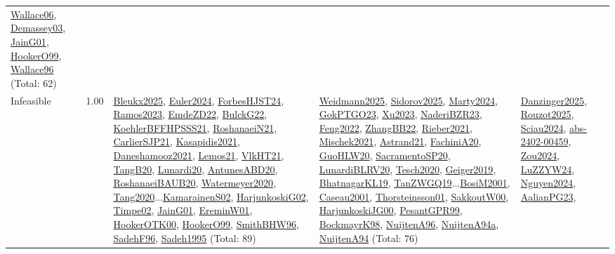 {\begin{longtable}{p{3cm}r>{\raggedright\arraybackslash}p{6cm}>{\raggedright\arraybackslash}p{6cm}>{\raggedright\arraybackslash}p{8cm}}
\hyperref[detail:Wallace06]{Wallace06}, \hyperref[detail:Demassey03]{Demassey03}, \hyperref[detail:JainG01]{JainG01}, \hyperref[detail:HookerO99]{HookerO99}, \hyperref[detail:Wallace96]{Wallace96} (Total: 62)\\
\index{Infeasible}\index{Concepts!Infeasible}Infeasible &  1.00 & \hyperref[detail:Bleukx2025]{Bleukx2025}, \hyperref[detail:Euler2024]{Euler2024}, \hyperref[detail:ForbesHJST24]{ForbesHJST24}, \hyperref[detail:Ramos2023]{Ramos2023}, \hyperref[detail:EmdeZD22]{EmdeZD22}, \hyperref[detail:BulckG22]{BulckG22}, \hyperref[detail:KoehlerBFFHPSSS21]{KoehlerBFFHPSSS21}, \hyperref[detail:RoshanaeiN21]{RoshanaeiN21}, \hyperref[detail:CarlierSJP21]{CarlierSJP21}, \hyperref[detail:Kasapidis2021]{Kasapidis2021}, \hyperref[detail:Daneshamooz2021]{Daneshamooz2021}, \hyperref[detail:Lemos21]{Lemos21}, \hyperref[detail:VlkHT21]{VlkHT21}, \hyperref[detail:TangB20]{TangB20}, \hyperref[detail:Lunardi20]{Lunardi20}, \hyperref[detail:AntunesABD20]{AntunesABD20}, \hyperref[detail:RoshanaeiBAUB20]{RoshanaeiBAUB20}, \hyperref[detail:Watermeyer2020]{Watermeyer2020}, \hyperref[detail:Tang2020]{Tang2020}...\hyperref[detail:KamarainenS02]{KamarainenS02}, \hyperref[detail:HarjunkoskiG02]{HarjunkoskiG02}, \hyperref[detail:Timpe02]{Timpe02}, \hyperref[detail:JainG01]{JainG01}, \hyperref[detail:EreminW01]{EreminW01}, \hyperref[detail:HookerOTK00]{HookerOTK00}, \hyperref[detail:HookerO99]{HookerO99}, \hyperref[detail:SmithBHW96]{SmithBHW96}, \hyperref[detail:SadehF96]{SadehF96}, \hyperref[detail:Sadeh1995]{Sadeh1995} (Total: 89) & \hyperref[detail:Weidmann2025]{Weidmann2025}, \hyperref[detail:Sidorov2025]{Sidorov2025}, \hyperref[detail:Marty2024]{Marty2024}, \hyperref[detail:GokPTGO23]{GokPTGO23}, \hyperref[detail:Xu2023]{Xu2023}, \hyperref[detail:NaderiBZR23]{NaderiBZR23}, \hyperref[detail:Feng2022]{Feng2022}, \hyperref[detail:ZhangBB22]{ZhangBB22}, \hyperref[detail:Rieber2021]{Rieber2021}, \hyperref[detail:Mischek2021]{Mischek2021}, \hyperref[detail:Astrand21]{Astrand21}, \hyperref[detail:FachiniA20]{FachiniA20}, \hyperref[detail:GuoHLW20]{GuoHLW20}, \hyperref[detail:SacramentoSP20]{SacramentoSP20}, \hyperref[detail:LunardiBLRV20]{LunardiBLRV20}, \hyperref[detail:Tesch2020]{Tesch2020}, \hyperref[detail:Geiger2019]{Geiger2019}, \hyperref[detail:BhatnagarKL19]{BhatnagarKL19}, \hyperref[detail:TanZWGQ19]{TanZWGQ19}...\hyperref[detail:BosiM2001]{BosiM2001}, \hyperref[detail:Caseau2001]{Caseau2001}, \hyperref[detail:Thorsteinsson01]{Thorsteinsson01}, \hyperref[detail:SakkoutW00]{SakkoutW00}, \hyperref[detail:HarjunkoskiJG00]{HarjunkoskiJG00}, \hyperref[detail:PesantGPR99]{PesantGPR99}, \hyperref[detail:BockmayrK98]{BockmayrK98}, \hyperref[detail:NuijtenA96]{NuijtenA96}, \hyperref[detail:NuijtenA94a]{NuijtenA94a}, \hyperref[detail:NuijtenA94]{NuijtenA94} (Total: 76) & \hyperref[detail:Danzinger2025]{Danzinger2025}, \hyperref[detail:Rouzot2025]{Rouzot2025}, \hyperref[detail:Sciau2024]{Sciau2024}, \hyperref[detail:abs-2402-00459]{abs-2402-00459}, \hyperref[detail:Zou2024]{Zou2024}, \hyperref[detail:LuZZYW24]{LuZZYW24}, \hyperref[detail:Nguyen2024]{Nguyen2024}, \hyperref[detail:AalianPG23]{AalianPG23}, 
\end{longtable}}
